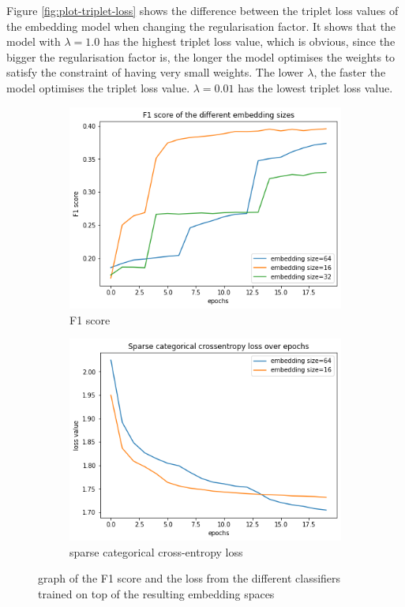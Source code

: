 \newline
\newline
Figure \ref{fig:plot-triplet-loss} shows the difference between the triplet loss values of the embedding model when changing the regularisation factor. It shows that the model with $\lambda = 1.0$ has the highest triplet loss value, which is obvious, since the bigger the regularisation factor is, the longer the model optimises the weights to satisfy the constraint of having very small weights. The lower $\lambda$, the faster the model optimises the triplet loss value. $\lambda = 0.01$ has the lowest triplet loss value.
\begin{figure}[tb]
\centering
\begin{subfigure}{.5\linewidth}
  \centering
  \includegraphics[width=.9\linewidth]{study-doc/experiment_embedding_size/assets/classifier_f1.png}
  \caption{F1 score}
  \label{fig:regularisation-experiment-classifier-f1}
\end{subfigure}%
\begin{subfigure}{.5\linewidth}
  \centering
  \includegraphics[width=.9\linewidth]{study-doc/experiment_embedding_size/assets/classifier_loss.png}
  \caption{sparse categorical cross-entropy loss}
  \label{fig:regularisation-experiment-classifier-loss}
\end{subfigure}
\caption{graph of the F1 score and the loss from the different classifiers trained on top of the resulting embedding spaces}
\label{fig:regularisation-experiment-classifier-metrics}
\end{figure}
